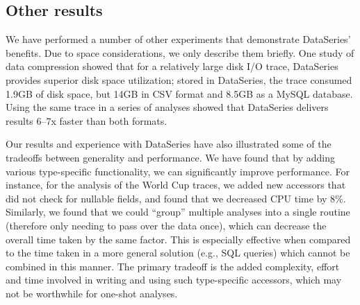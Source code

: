 \documentclass{acm_proc_article-sp}
\newcommand{\fix}[1]{{\LARGE\ensuremath{\bullet}}\textbf{#1}}
\begin{document}


\subsection{Other results}\label{sec:otherresults}

We have performed a number of other experiments that demonstrate
DataSeries' benefits. Due to space considerations, we only
describe them briefly. One study of data compression showed that for a
relatively large disk I/O trace, DataSeries provides superior disk
space utilization; stored in DataSeries, the trace consumed 1.9GB of
disk space, but 14GB in CSV format and 8.5GB as a MySQL
database. Using the same trace in a series of analyses showed that
DataSeries delivers results 6--7x faster than both formats.

Our results and experience with DataSeries have also illustrated some
of the tradeoffs between generality and performance. We have found
that by adding various type-specific functionality, we can
significantly improve performance. For instance, for the analysis of
the World Cup traces, we added new accessors that did not check for
nullable fields, and found that we decreased CPU time by
8\%. Similarly, we found that we could ``group'' multiple analyses
into a single routine (therefore only needing to pass over the data
once), which can decrease the overall time taken by the same
factor. This is especially effective when compared to the time taken
in a more general solution (e.g., SQL queries) which cannot be combined
in this manner. The primary tradeoff is the added complexity, effort
and time involved in writing and using such type-specific
accessors, which may not be worthwhile for one-shot analyses.
\end{document}
